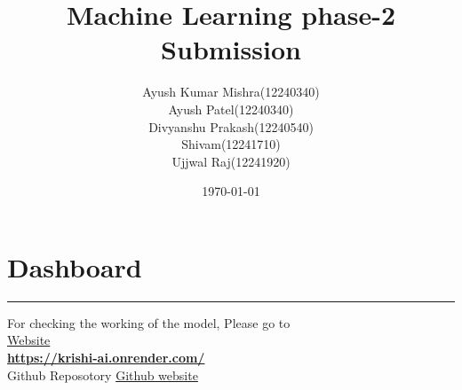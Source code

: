 \documentclass{article}
\title{\textcolor{primaryColor}{\Huge\textbf{Machine Learning phase-2 Submission}}}
\author{%
  \textcolor{namecolor}{%
    \begin{tabular}{r@{ }l}
      Ayush Kumar Mishra & (12240340) \\
      Ayush Patel & (12240340) \\
      Divyanshu Prakash & (12240540) \\
      Shivam & (12241710) \\
      Ujjwal Raj & (12241920)
    \end{tabular}%
  }%
}
\date{\textcolor{secondaryColor}{\today}}
\begin{document}
\maketitle

\newpage
\section*{Dashboard}
  \begin{center}
        \color{red}\rule{1\linewidth}{1mm}
    \end{center}
\begin{center}
\vspace{2in}
    {\Huge  For checking the working of the model, Please go to  \\
    \vspace{1.5in}
    \href{https://krishi-ai.onrender.com/}{Website}}\\
    
    \vspace{0.7in}
   \textbf{ \href{https://krishi-ai.onrender.com/}{https://krishi-ai.onrender.com/}}\\
    \vspace{0.7in}
   Github Reposotory \href{https://github.com/Ayush-mishra-0-0/cs550/}{Github website}\\

\end{center}



\newpage
\end{document}
